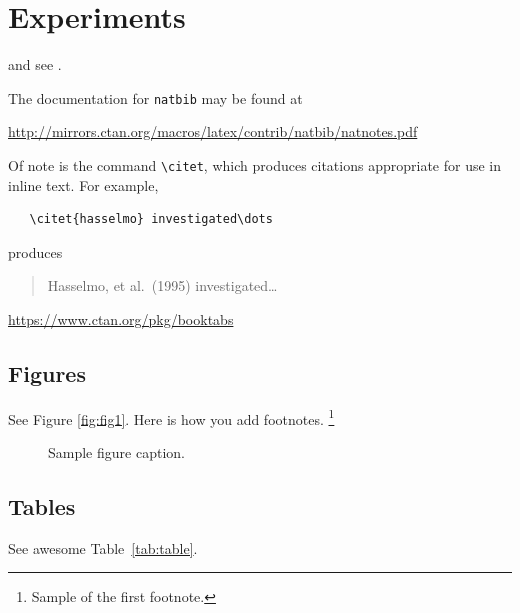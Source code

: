 \documentclass{article}
\begin{document}

\section{Experiments}
\label{sec:others}
\lipsum[8] \cite{kour2014real,kour2014fast} and see \cite{hadash2018estimate}.

The documentation for \verb+natbib+ may be found at
\begin{center}
  \url{http://mirrors.ctan.org/macros/latex/contrib/natbib/natnotes.pdf}
\end{center}
Of note is the command \verb+\citet+, which produces citations
appropriate for use in inline text.  For example,
\begin{verbatim}
   \citet{hasselmo} investigated\dots
\end{verbatim}
produces
\begin{quote}
  Hasselmo, et al.\ (1995) investigated\dots
\end{quote}

\begin{center}
  \url{https://www.ctan.org/pkg/booktabs}
\end{center}


\subsection{Figures}
\lipsum[10] 
See Figure \ref{fig:fig1}. Here is how you add footnotes. \footnote{Sample of the first footnote.}
\lipsum[11] 

\begin{figure}
  \centering
  \fbox{\rule[-.5cm]{4cm}{4cm} \rule[-.5cm]{4cm}{0cm}}
  \caption{Sample figure caption.}
\end{figure}

\subsection{Tables}
\lipsum[12]
See awesome Table~\ref{tab:table}.

\end{document}
